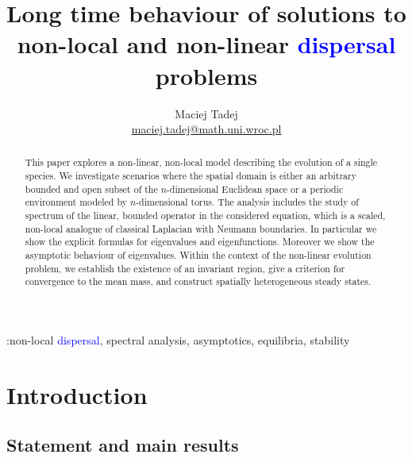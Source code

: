 \documentclass[12pt, a4paper]{article}
\title{Long time behaviour of solutions to non-local and non-linear \textcolor{blue}{dispersal} problems}
\author{Maciej Tadej \\ \href{mailto:maciej.tadej@math.uni.wroc.pl}{maciej.tadej@math.uni.wroc.pl}}
\affil{\textit{Insitute of Mathematics, University of Wrocław, pl. Grunwaldzki 2, 50-384 Wrocław}}
\date{}
\theoremstyle{break}
\theoremstyle{break}
\theoremstyle{break}
\theoremstyle{break}
\theoremstyle{break}
\begin{document}
\maketitle

\hspace{20pt}

\begin{abstract}
This paper explores a non-linear, non-local model describing the evolution of a single species. We investigate scenarios where the spatial domain is either an arbitrary bounded and open subset of the $n$-dimensional Euclidean space or a periodic environment modeled by $n$-dimensional torus. The analysis includes the study of spectrum of the linear, bounded operator in the considered equation, which is a scaled, non-local analogue of classical Laplacian with Neumann boundaries. In particular we show the explicit formulas for eigenvalues and eigenfunctions. Moreover we show the asymptotic behaviour of eigenvalues. Within the context of the non-linear evolution problem, we establish the existence of an invariant region, give a criterion for convergence to the mean mass, and construct spatially heterogeneous steady states.
\end{abstract}

\begin{keywords} :non-local \textcolor{blue}{dispersal}, spectral analysis, asymptotics, equilibria, stability
\end{keywords}

\newpage

\section{Introduction}

\subsection{Statement and main results}
\end{document}
